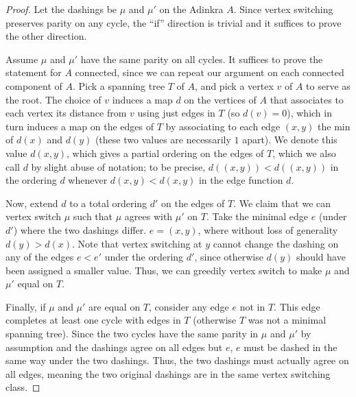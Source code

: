 \documentclass[12pt,twoside,singlespace]{article}
\numberwithin{equation}{section}
\theoremstyle{definition}
\begin{document}
\begin{proof}
Let the dashings be $\mu$ and $\mu'$ on the Adinkra $A$. Since vertex switching preserves parity on any cycle, the ``if'' direction is trivial and it suffices to prove the other direction.

Assume $\mu$ and $\mu'$ have the same parity on all cycles. It suffices to prove the statement for $A$ connected, since we can repeat our argument on each connected component of $A$. Pick a spanning tree $T$ of $A$, and pick a vertex $v$ of $A$ to serve as the root. The choice of $v$ induces a map $d$ on the vertices of $A$ that associates to each vertex its distance from $v$ using just edges in $T$ (so $d(v) = 0$), which in turn induces a map on the edges of $T$ by associating to each edge $(x,y)$ the min of $d(x)$ and $d(y)$ (these two values are necessarily $1$ apart). We denote this value $d(x,y)$, which gives a partial ordering on the edges of $T$, which we also call $d$ by slight abuse of notation; to be precise, $d((x,y)) < d((x,y))$ in the ordering $d$ whenever $d(x,y) < d(x,y)$ in the edge function $d$.

Now, extend $d$ to a total ordering $d'$ on the edges of $T$. We claim that we can vertex switch $\mu$ such that $\mu$ agrees with $\mu'$ on $T$. Take the minimal edge $e$ (under $d'$) where the two dashings differ. $e = (x,y)$, where without loss of generality $d(y) > d(x)$. Note that vertex switching at $y$ cannot change the dashing on any of the edges $e < e'$ under the ordering $d'$, since otherwise $d(y)$ should have been assigned a smaller value. Thus, we can greedily vertex switch to make $\mu$ and $\mu'$ equal on $T$.

Finally, if $\mu$ and $\mu'$ are equal on $T$, consider any edge $e$ not in $T$. This edge completes at least one cycle with edges in $T$ (otherwise $T$ was not a minimal spanning tree). Since the two cycles have the same parity in $\mu$ and $\mu'$ by assumption and the dashings agree on all edges but $e$, $e$ must be dashed in the same way under the two dashings. Thus, the two dashings must actually agree on all edges, meaning the two original dashings are in the same vertex switching class.

\end{proof}
\end{document}
